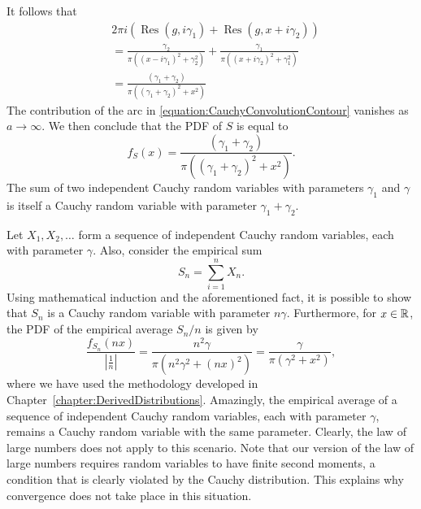 It follows that
\begin{equation*}
\begin{split}
& 2 \pi i \left( \operatorname{Res} (g, i \gamma_1)
+ \operatorname{Res} (g, x + i \gamma_2) \right) \\
&= \frac{\gamma_2}{\pi \left( ( x - i \gamma_1 )^2 + \gamma_2^2 \right) }
+ \frac{\gamma_1}{\pi \left( ( x + i \gamma_2 )^2 + \gamma_1^2 \right) } \\
&= \frac{(\gamma_1 + \gamma_2)}
{\pi \left( (\gamma_1 + \gamma_2)^2 + x^2 \right) }
\end{split}
\end{equation*}
The contribution of the arc in \eqref{equation:CauchyConvolutionContour} vanishes as $a \rightarrow \infty$.
We then conclude that the PDF of $S$ is equal to
\begin{equation*}
f_S (x) = \frac{(\gamma_1 + \gamma_2)}
{\pi \left( (\gamma_1 + \gamma_2)^2 + x^2 \right) } .
\end{equation*}
The sum of two independent Cauchy random variables with parameters $\gamma_1$ and $\gamma$ is itself a Cauchy random variable with parameter $\gamma_1 + \gamma_2$.

Let $X_1, X_2, \ldots$ form a sequence of independent Cauchy random variables, each with parameter $\gamma$.
Also, consider the empirical sum
\begin{equation*}
S_n = \sum_{i=1}^n X_n .
\end{equation*}
Using mathematical induction and the aforementioned fact, it is possible to show that $S_n$ is a Cauchy random variable with parameter $n \gamma$.
Furthermore, for $x \in \mathbb{R}$, the PDF of the empirical average $S_n / n$ is given by
\begin{equation*}
\frac{f_{S_n} ( n x )}{\left| \frac{1}{n} \right|}
= \frac{n^2 \gamma}{\pi \left( n^2 \gamma^2 + (nx)^2 \right)}
= \frac{\gamma}{\pi \left( \gamma^2 + x^2 \right)} ,
\end{equation*}
where we have used the methodology developed in Chapter~\ref{chapter:DerivedDistributions}.
Amazingly, the empirical average of a sequence of independent Cauchy random variables, each with parameter $\gamma$, remains a Cauchy random variable with the same parameter.
Clearly, the law of large numbers does not apply to this scenario.
Note that our version of the law of large numbers requires random variables to have finite second moments, a condition that is clearly violated by the Cauchy distribution.
This explains why convergence does not take place in this situation.


